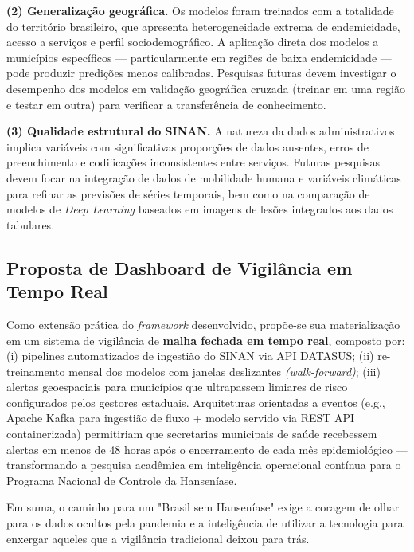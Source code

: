 \textbf{(2) Generalização geográfica.} Os modelos foram treinados com a totalidade do território brasileiro, que apresenta heterogeneidade extrema de endemicidade, acesso a serviços e perfil sociodemográfico. A aplicação direta dos modelos a municípios específicos — particularmente em regiões de baixa endemicidade — pode produzir predições menos calibradas. Pesquisas futuras devem investigar o desempenho dos modelos em validação geográfica cruzada (treinar em uma região e testar em outra) para verificar a transferência de conhecimento.

\textbf{(3) Qualidade estrutural do SINAN.} A natureza da dados administrativos implica variáveis com significativas proporções de dados ausentes, erros de preenchimento e codificações inconsistentes entre serviços. Futuras pesquisas devem focar na integração de dados de mobilidade humana e variáveis climáticas para refinar as previsões de séries temporais, bem como na comparação de modelos de \textit{Deep Learning} baseados em imagens de lesões integrados aos dados tabulares.

\subsection{Proposta de Dashboard de Vigilância em Tempo Real}

Como extensão prática do \textit{framework} desenvolvido, propõe-se sua materialização em um sistema de vigilância de \textbf{malha fechada em tempo real}, composto por: (i) pipelines automatizados de ingestião do SINAN via API DATASUS; (ii) re-treinamento mensal dos modelos com janelas deslizantes \textit{(walk-forward)}; (iii) alertas geoespaciais para municípios que ultrapassem limiares de risco configurados pelos gestores estaduais. Arquiteturas orientadas a eventos (e.g., Apache Kafka para ingestião de fluxo + modelo servido via REST API containerizada) permitiriam que secretarias municipais de saúde recebessem alertas em menos de 48 horas após o encerramento de cada mês epidemiológico — transformando a pesquisa acadêmica em inteligência operacional contínua para o Programa Nacional de Controle da Hanseníase.

Em suma, o caminho para um "Brasil sem Hanseníase" exige a coragem de olhar para os dados ocultos pela pandemia e a inteligência de utilizar a tecnologia para enxergar aqueles que a vigilância tradicional deixou para trás.